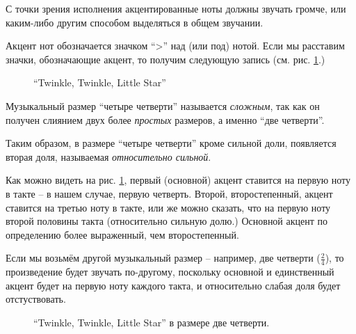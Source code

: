 \documentclass[a4paper,twoside]{book}
\begin{document}
С точки зрения исполнения акцентированные ноты должны звучать громче, или
каким-либо другим способом выделяться в общем звучании.

Акцент нот обозначается значком ``>'' над (или под) нотой.  Если мы расставим
значки, обозначающие акцент, то получим следующую запись
(см. рис. \ref{fig:lilypond-musical-scale-example-2}.)

\begin{figure}[ht]
  \caption{``Twinkle, Twinkle, Little Star''}
  \centering
  \label{fig:lilypond-musical-scale-example-2}
\end{figure}

Музыкальный размер ``четыре четверти'' называется \emph{сложным}, так как он
получен слиянием двух более \emph{простых} размеров, а именно ``две четверти''.

Таким образом, в размере ``четыре четверти'' кроме сильной доли, появляется
вторая доля, называемая \emph{относительно сильной}.

Как можно видеть на рис. \ref{fig:lilypond-musical-scale-example-2}, первый
(основной) акцент ставится на первую ноту в такте -- в нашем случае, первую
четверть.  Второй, второстепенный, акцент ставится на третью ноту в такте, или
же можно сказать, что на первую ноту второй половины такта (относительно сильную
долю.)  Основной акцент по определению более выраженный, чем второстепенный.

Если мы возьмём другой музыкальный размер -- например, две четверти
($\frac{2}{4}$), то произведение будет звучать по-другому, поскольку основной и
единственный акцент будет на первую ноту каждого такта, и относительно слабая
доля будет отстуствовать.

\begin{figure}[ht]
  \caption{``Twinkle, Twinkle, Little Star'' в размере две четверти.}
  \centering
  \label{fig:lilypond-musical-scale-example-3}
\end{figure}
\end{document}
